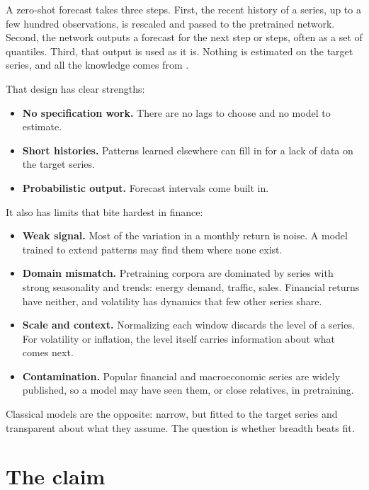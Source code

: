 A zero-shot forecast takes three steps. First, the recent history of a series, up to a few hundred observations, is rescaled and passed to the pretrained network. Second, the network outputs a forecast for the next step or steps, often as a set of quantiles. Third, that output is used as it is. Nothing is estimated on the target series, and all the knowledge comes from .

That design has clear strengths:

\begin{itemize}
  \item \textbf{No specification work.} There are no lags to choose and no model to estimate.
  \item \textbf{Short histories.} Patterns learned elsewhere can fill in for a lack of data on the target series.
  \item \textbf{Probabilistic output.} Forecast intervals come built in.
\end{itemize}

It also has limits that bite hardest in finance:

\begin{itemize}
  \item \textbf{Weak signal.} Most of the variation in a monthly return is noise. A model trained to extend patterns may find them where none exist.
  \item \textbf{Domain mismatch.} Pretraining corpora are dominated by series with strong seasonality and trends: energy demand, traffic, sales. Financial returns have neither, and volatility has dynamics that few other series share.
  \item \textbf{Scale and context.} Normalizing each window discards the level of a series. For volatility or inflation, the level itself carries information about what comes next.
  \item \textbf{Contamination.} Popular financial and macroeconomic series are widely published, so a model may have seen them, or close relatives, in pretraining.
\end{itemize}

Classical models are the opposite: narrow, but fitted to the target series and transparent about what they assume. The question is whether breadth beats fit.

\section{The claim}
\label{sec:21-claim}

